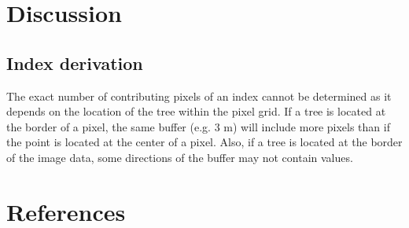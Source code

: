 \documentclass[review]{elsarticle}
\begin{document}
\section{Discussion}

\subsection{Index derivation}

The exact number of contributing pixels of an index cannot be determined as it depends on the location of the tree within the pixel grid.
If a tree is located at the border of a pixel, the same buffer (e.g. 3 m) will include more pixels than if the point is located at the center of a pixel.
Also, if a tree is located at the border of the image data, some directions of the buffer may not contain values.

\section*{References}


\end{document}
